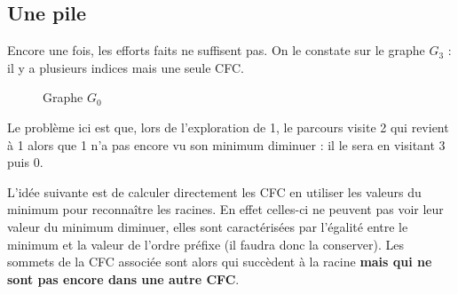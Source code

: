 \subsection{Une pile} 
Encore une fois, les efforts faits ne suffisent pas. On le constate sur le graphe $G_3$ : il y a plusieurs indices mais une seule CFC.

\begin{figure}[ht]
\begin{center}
\caption{Graphe $G_0$}
\end{center}
\end{figure}
Le problème ici est que, lors de l'exploration de 1, le parcours visite 2 qui revient à 1 alors que 1 n'a pas encore vu son minimum diminuer : il le sera en visitant 3 puis 0.

L'idée suivante est de calculer directement les CFC en utiliser les valeurs du minimum pour reconnaître les racines. En effet celles-ci ne peuvent pas voir leur valeur du minimum diminuer, elles sont caractérisées par l'égalité entre le minimum et la valeur de l'ordre préfixe (il faudra donc la conserver). Les sommets de la CFC associée sont alors qui succèdent à la racine {\bf mais qui ne sont pas encore dans une autre CFC}.

